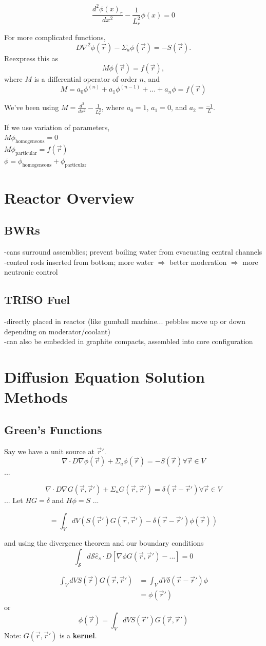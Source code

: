 \documentclass{report}
\newcommand{\tab}{\-\hspace{1cm}}
\newcommand{\h}[1]{\section*{#1}}
\newcommand{\hh}[1]{\subsection*{#1}}
\newcommand{\Xs}{\Sigma}
\newcommand{\pos}{\vec{r}}
\newcommand{\greens}{G(\pos,\pos')}
\begin{document}
$$\frac{d^2\phi(x)_r}{dx^2} - \frac{1}{L_r^2}\phi(x) = 0$$

For more complicated functions,
$$ D \nabla^2 \phi(\pos) - \Sigma_a\phi(\pos) = -S(\pos) .$$
Reexpress this as
$$ M\phi(\pos) = f(\pos), $$
where $M$ is a differential operator of order $n$, and
$$ M = a_0\phi^{(n)} + a_1\phi^{(n-1)} + ... + a_n\phi = f(\pos) $$

We've been using $M = \frac{d^2}{dx^2} - \frac{1}{L_r^2}$, where $a_0=1$, $a_1=0$, and $a_2 = \frac{-1}{L}$.

If we use variation of parameters,\\
\tab $ M\phi_{\text{homogeneous}} = 0 $ \\
\tab $ M\phi_{\text{particular}} = f(\pos) $ \\
\tab $ \phi = \phi_{\text{homogeneous}} +\phi_{\text{particular}}$



\h{Reactor Overview}

\hh{BWRs}

-cans surround assemblies; prevent boiling water from evacuating central channels\\
-control rods inserted from bottom; more water $\Rightarrow$ better moderation $\Rightarrow$ more neutronic control \\

\hh{TRISO Fuel}

-directly placed in reactor (like gumball machine... pebbles move up or down depending on moderator/coolant) \\
-can also be embedded in graphite compacts, assembled into core configuration



\h{Diffusion Equation Solution Methods}

\hh{Green's Functions}

Say we have a unit source at $\pos'$. 
$$ \nabla \cdot D \nabla \phi(\pos) +\Xs_a \phi(\pos) = -S(\pos) \forall \pos \in V$$
...

$$ \nabla \cdot D \nabla \greens + \Xs_a \greens = \delta(\pos-\pos') \forall \pos \in V $$
...
Let $HG = \delta$ and $H\phi = S$
...

$$ = \int_V dV \left( S(\pos') \greens - \delta(\pos-\pos')\phi(\pos)\right)$$

and using the divergence theorem and our boundary conditions
$$ \int_{\mathcal{S}} d\mathcal{S} \hat{e}_s \cdot D \left[ \nabla \phi \greens - ... \right] = 0 $$

\begin{align*}
\int_V dV S(\pos)\greens	&= \int_V dV \delta(\pos-\pos')\phi \\
							&= \phi(\pos') 
\end{align*}
or 
$$ \phi(\pos) = \int_V dV S(\pos')\greens $$
Note: $\greens$ is a \textbf{kernel}.
\end{document}
